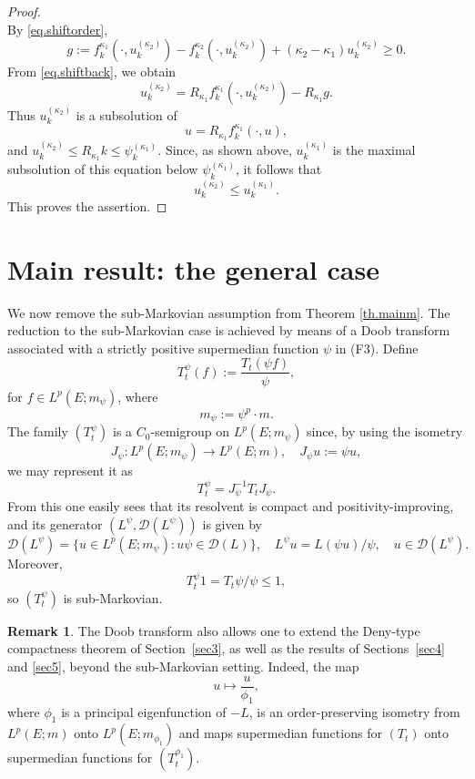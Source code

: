 \documentclass[11pt,a4paper,reqno]{amsart}
\theoremstyle{definition}
\newtheorem{remark}[theorem]{Remark}
\numberwithin{equation}{section}
\begin{document}
\begin{proof}
\begin{equation}
\end{equation}
By \eqref{eq.shiftorder},
\[
g:=f_k^{\kappa_1}(\cdot,u_k^{(\kappa_2)})-f_k^{\kappa_2}(\cdot,u_k^{(\kappa_2)})+(\kappa_2-\kappa_1)u_k^{(\kappa_2)}\ge0.
\]
From   \eqref{eq.shiftback}, we obtain 
\[
u_k^{(\kappa_2)}=R_{\kappa_1}f_k^{\kappa_1}(\cdot,u_k^{(\kappa_2)})-R_{\kappa_1}g.
\]
Thus $u_k^{(\kappa_2)}$ is a subsolution of
\[
u=R_{\kappa_1}f_k^{\kappa_1}(\cdot,u),
\]
and $u_k^{(\kappa_2)}\le R_{\kappa_1}k\le  \psi^{(\kappa_1)}_k$.
Since, as shown above, $u_k^{(\kappa_1)}$ is the maximal subsolution
of this equation  below $\psi^{(\kappa_1)}_k$, it follows that
\[
u_k^{(\kappa_2)}\le u_k^{(\kappa_1)}.
\]
This proves the assertion.
\end{proof}






\section{Main result: the general case}
\label{sec7}

We now remove the sub-Markovian assumption from Theorem \ref{th.mainm}. 
The reduction to the sub-Markovian case is achieved by means of a Doob transform associated 
with  a  strictly positive supermedian function $\psi$ in (F3).
Define
\begin{equation}
\label{eq.semdt}
T^{\psi}_t(f):=\frac{T_t(\psi f)}{\psi},
\end{equation}
for $f\in L^p(E; m_\psi)$, where
\[
m_\psi:=\psi^p\cdot m.
\]
The family $(T_t^{\psi})$ is a $C_0$-semigroup on $L^p(E;m_\psi)$ since, by using the isometry
$$
J_\psi: L^p(E ; m_\psi) \rightarrow L^p(E;m), \quad J_\psi u:=\psi u,
$$
we may represent it as 
$$
T_t^\psi=J_\psi^{-1} T_t J_\psi.
$$
From this one easily sees that  its resolvent is  compact and positivity-improving, and its 
generator $(L^{\psi},\mathscr D(L^{\psi}))$ is given by
\begin{equation}
\label{eq.opdt}
\mathscr D(L^{\psi})=\{u\in L^p(E;m_\psi): u\psi\in \mathscr D(L)\},\quad L^{\psi}u= L(\psi u)/\psi,\quad u\in \mathscr D(L^{\psi}).
\end{equation}
Moreover,
\[
T_t^{\psi}1=T_t\psi/\psi\le1,
\]
so $(T_t^{\psi})$ is sub-Markovian.

\begin{remark}
\label{rem.doobgen}
The Doob transform also allows one to extend the Deny-type
compactness theorem of Section~\ref{sec3}, as well as the results of
Sections~\ref{sec4} and \ref{sec5}, beyond the sub-Markovian setting.
Indeed, the map
\[
u\longmapsto \frac{u}{\phi_1},
\]
where $\phi_1$ is a principal eigenfunction of $-L$, 
is an order-preserving isometry from $L^p(E;m)$ onto
$L^p(E;m_{\phi_1})$ and maps supermedian functions for $(T_t)$ onto
supermedian functions for $(T_t^{\phi_1})$.
\end{remark}
\end{document}
